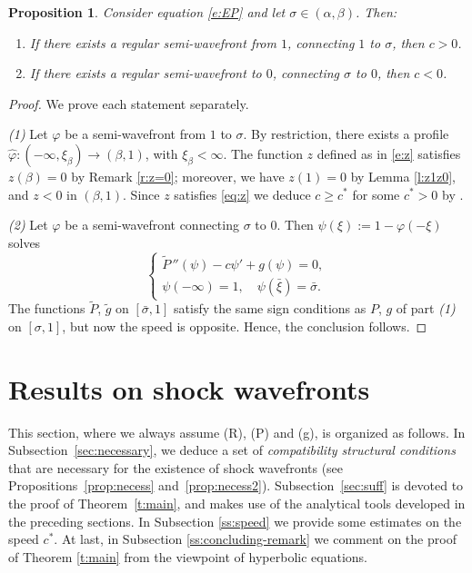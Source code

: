 \documentclass[11pt,a4paper]{article}
\newtheorem{proposition}{Proposition}[section]
\renewcommand{\phi}{\varphi}
\begin{document}
\begin{proposition}\label{p:2eta}
Consider equation \eqref{e:EP} and let $\sigma \in (\alpha, \beta)$. Then:
\begin{enumerate}[label=(\arabic*)]
\item If there exists a regular semi-wavefront from $1$, connecting $1$ to $\sigma$, then $c > 0$.
\item If there exists a regular semi-wavefront to $0$, connecting $\sigma$ to $0$, then $c < 0$.
\end{enumerate}
\end{proposition}

\begin{proof}
We prove each statement separately.

\smallskip
\textit{(1)} Let $\phi$ be a semi-wavefront from $1$ to $\sigma$. By restriction, there exists a profile $\hat\phi: (-\infty, \xi_\beta) \to (\beta,1)$, with $\xi_\beta < \infty$. The function $z$ defined as in \eqref{e:z} satisfies $z(\beta) = 0$ by Remark \ref{r:z=0}; moreover,
we have $z(1) = 0$ by Lemma \ref{l:z1z0}, and $z < 0$ in $(\beta, 1)$. Since  $z$ satisfies \eqref{eq:z} we deduce $c \geq c^*$ for some $c^* > 0$  by \cite[Lem. 4.1, Cor. 4.1]{BCM3}.

\smallskip
\textit{(2)} Let $\phi$ be a semi-wavefront connecting $\sigma$ to $0$. Then $\psi(\xi) := 1 - \phi(-\xi)$ solves
\[
\begin{cases}
\tilde{P}\, ''(\psi)-c \psi' + g(\psi) = 0, \\
\psi(-\infty) = 1, \quad \psi(\bar{\xi}) = \bar{\sigma}.
\end{cases}
\]
The functions $\tilde{P}$, $\tilde{g}$ on $[\bar{\sigma}, 1]$ satisfy the same sign conditions as $P$, $g$ of part {\em (1)} on $[\sigma, 1]$,  but now the speed is opposite. Hence, the conclusion follows.
\end{proof}

\section{Results on shock wavefronts}
\label{s:WF}
\setcounter{equation}{0}

This section, where we always assume (R), (P) and (g), is organized as follows.  
In Subsection~\ref{sec:necessary}, we deduce a set of \emph{compatibility structural conditions} that are necessary for the existence of shock wavefronts (see Propositions~\ref{prop:necess} and~\ref{prop:necess2}).
Subsection~\ref{sec:suff} is devoted to the proof of Theorem~\ref{t:main}, and makes use of the analytical tools developed in the preceding sections. In Subsection \ref{ss:speed} we provide some estimates on the speed $c^*$. At last, in Subsection \ref{ss:concluding-remark} we comment on the proof of Theorem \ref{t:main} from the viewpoint of hyperbolic equations. 
\end{document}
